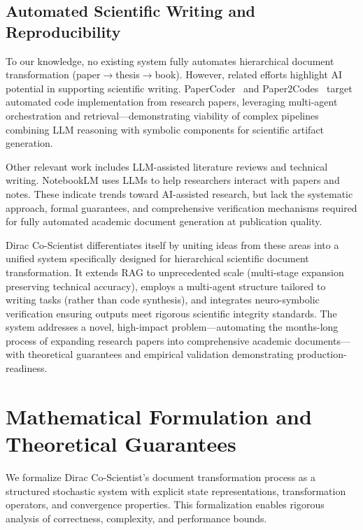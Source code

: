 \documentclass{ieeeaccess}
\begin{document}
\subsection{Automated Scientific Writing and Reproducibility}

To our knowledge, no existing system fully automates hierarchical document transformation (paper$\rightarrow$thesis$\rightarrow$book). However, related efforts highlight AI potential in supporting scientific writing. PaperCoder~\cite{seo2024papercoder} and Paper2Codes~\cite{adnan2025paper2codes} target automated code implementation from research papers, leveraging multi-agent orchestration and retrieval—demonstrating viability of complex pipelines combining LLM reasoning with symbolic components for scientific artifact generation.

Other relevant work includes LLM-assisted literature reviews and technical writing. NotebookLM uses LLMs to help researchers interact with papers and notes. These indicate trends toward AI-assisted research, but lack the systematic approach, formal guarantees, and comprehensive verification mechanisms required for fully automated academic document generation at publication quality.

Dirac Co-Scientist differentiates itself by uniting ideas from these areas into a unified system specifically designed for hierarchical scientific document transformation. It extends RAG to unprecedented scale (multi-stage expansion preserving technical accuracy), employs a multi-agent structure tailored to writing tasks (rather than code synthesis), and integrates neuro-symbolic verification ensuring outputs meet rigorous scientific integrity standards. The system addresses a novel, high-impact problem—automating the months-long process of expanding research papers into comprehensive academic documents—with theoretical guarantees and empirical validation demonstrating production-readiness.

\section{Mathematical Formulation and Theoretical Guarantees}\label{sec:formal}

We formalize Dirac Co-Scientist's document transformation process as a structured stochastic system with explicit state representations, transformation operators, and convergence properties. This formalization enables rigorous analysis of correctness, complexity, and performance bounds.
\end{document}
